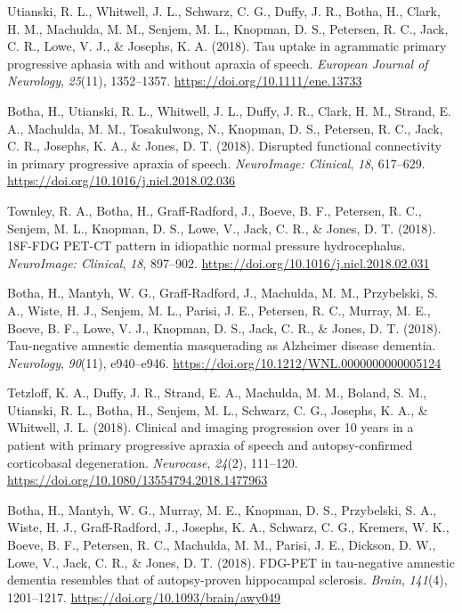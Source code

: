 \documentclass[11pt, a4paper]{awesome-cv}
\begin{document}
\leavevmode\hypertarget{ref-utianski_tau_2018}{}%
Utianski, R. L., Whitwell, J. L., Schwarz, C. G., Duffy, J. R., Botha,
H., Clark, H. M., Machulda, M. M., Senjem, M. L., Knopman, D. S.,
Petersen, R. C., Jack, C. R., Lowe, V. J., \& Josephs, K. A. (2018). Tau
uptake in agrammatic primary progressive aphasia with and without
apraxia of speech. \emph{European Journal of Neurology}, \emph{25}(11),
1352--1357. \url{https://doi.org/10.1111/ene.13733}

\leavevmode\hypertarget{ref-botha_disrupted_2018}{}%
Botha, H., Utianski, R. L., Whitwell, J. L., Duffy, J. R., Clark, H. M.,
Strand, E. A., Machulda, M. M., Tosakulwong, N., Knopman, D. S.,
Petersen, R. C., Jack, C. R., Josephs, K. A., \& Jones, D. T. (2018).
Disrupted functional connectivity in primary progressive apraxia of
speech. \emph{NeuroImage: Clinical}, \emph{18}, 617--629.
\url{https://doi.org/10.1016/j.nicl.2018.02.036}

\leavevmode\hypertarget{ref-townley_18f-fdg_2018}{}%
Townley, R. A., Botha, H., Graff-Radford, J., Boeve, B. F., Petersen, R.
C., Senjem, M. L., Knopman, D. S., Lowe, V., Jack, C. R., \& Jones, D.
T. (2018). {18F}-{FDG} {PET}-{CT} pattern in idiopathic normal pressure
hydrocephalus. \emph{NeuroImage: Clinical}, \emph{18}, 897--902.
\url{https://doi.org/10.1016/j.nicl.2018.02.031}

\leavevmode\hypertarget{ref-botha_tau-negative_2018}{}%
Botha, H., Mantyh, W. G., Graff-Radford, J., Machulda, M. M.,
Przybelski, S. A., Wiste, H. J., Senjem, M. L., Parisi, J. E., Petersen,
R. C., Murray, M. E., Boeve, B. F., Lowe, V. J., Knopman, D. S., Jack,
C. R., \& Jones, D. T. (2018). Tau-negative amnestic dementia
masquerading as {Alzheimer} disease dementia. \emph{Neurology},
\emph{90}(11), e940--e946.
\url{https://doi.org/10.1212/WNL.0000000000005124}

\leavevmode\hypertarget{ref-tetzloff_clinical_2018}{}%
Tetzloff, K. A., Duffy, J. R., Strand, E. A., Machulda, M. M., Boland,
S. M., Utianski, R. L., Botha, H., Senjem, M. L., Schwarz, C. G.,
Josephs, K. A., \& Whitwell, J. L. (2018). Clinical and imaging
progression over 10 years in a patient with primary progressive apraxia
of speech and autopsy-confirmed corticobasal degeneration.
\emph{Neurocase}, \emph{24}(2), 111--120.
\url{https://doi.org/10.1080/13554794.2018.1477963}

\leavevmode\hypertarget{ref-botha_fdg-pet_2018}{}%
Botha, H., Mantyh, W. G., Murray, M. E., Knopman, D. S., Przybelski, S.
A., Wiste, H. J., Graff-Radford, J., Josephs, K. A., Schwarz, C. G.,
Kremers, W. K., Boeve, B. F., Petersen, R. C., Machulda, M. M., Parisi,
J. E., Dickson, D. W., Lowe, V., Jack, C. R., \& Jones, D. T. (2018).
{FDG}-{PET} in tau-negative amnestic dementia resembles that of
autopsy-proven hippocampal sclerosis. \emph{Brain}, \emph{141}(4),
1201--1217. \url{https://doi.org/10.1093/brain/awy049}
\end{document}
